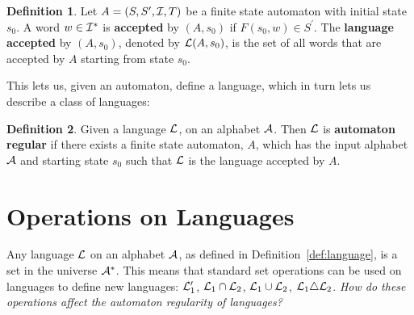 \documentclass[a4paper]{article}
\theoremstyle{definition}
\newtheorem{definition}{Definition}[section]
\theoremstyle{definition}
\theoremstyle{definition}
\begin{document}
\begin{definition}
    \label{def:langAccepted}
    Let $A = (S, S^\prime, \mathcal{I}, T)$ be a finite state automaton with initial state $s_0$. A word $w \in \mathcal{I}^*$ is \textbf{accepted} by $(A,s_0)$ if $F(s_0,w) \in S^\prime$. The \textbf{language accepted} by $(A, s_0)$, denoted by $\mathcal{L}(A,s_0)$, is the set of all words that are accepted by $A$ starting from state $s_0$.
\end{definition}

\noindent This lets us, given an automaton, define a language, which in turn lets us describe a class of languages:

\begin{definition}
    \label{def:automatonRegular}
    Given a language $\mathcal{L}$, on an alphabet $\mathcal{A}$. Then $\mathcal{L}$ is \textbf{automaton regular} if there exists a finite state automaton, $A$, which has the input alphabet $\mathcal{A}$ and starting state $s_0$ such that $\mathcal{L}$ is the language accepted by $A$.
\end{definition}

\section{Operations on Languages}

Any language $\mathcal{L}$ on an alphabet $\mathcal{A}$, as defined in Definition~\ref{def:language}, is a set in the universe $\mathcal{A}^*$. This means that standard set operations can be used on languages to define new languages: $\mathcal{L}_1^\prime$, $\mathcal{L}_1 \cap \mathcal{L}_2$, $\mathcal{L}_1 \cup \mathcal{L}_2$, $\mathcal{L}_1 \triangle \mathcal{L}_2$. \emph{How do these operations affect the \emph{automaton regularity} of languages?}
\end{document}

